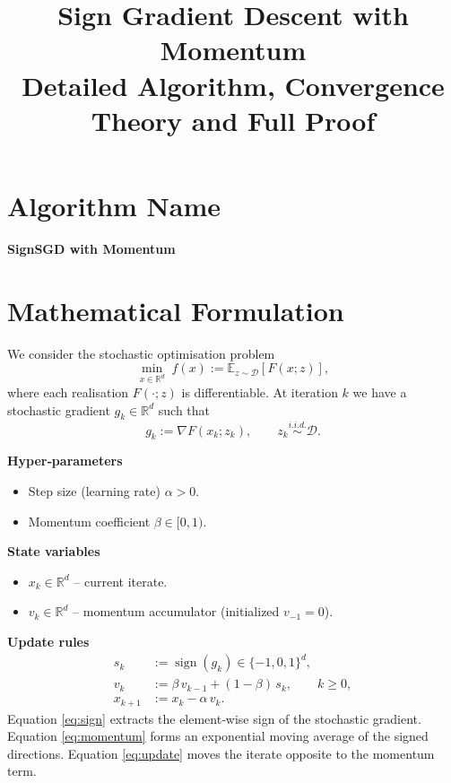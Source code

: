 \documentclass[11pt]{article}
\newcommand{\sign}{\operatorname{sign}}
\newcommand{\E}{\mathbb{E}}
\newcommand{\R}{\mathbb{R}}
\begin{document}
\title{Sign Gradient Descent with Momentum \\ Detailed Algorithm, Convergence Theory and Full Proof}
\author{}
\date{}
\maketitle

\tableofcontents
\newpage

\section*{Algorithm Name}
\begin{center}
\textbf{SignSGD with Momentum}
\end{center}
\section{Mathematical Formulation}
We consider the stochastic optimisation problem
\[
\min_{x\in\R^{d}} \; f(x):=\E_{z\sim\mathcal{D}}[F(x;z)],
\]
where each realisation $F(\cdot;z)$ is differentiable.  
At iteration $k$ we have a stochastic gradient $g_k\in\R^{d}$ such that 
\[
g_k:=\nabla F(x_k;z_k),\qquad z_k\stackrel{i.i.d.}{\sim}\mathcal{D}.
\]

\medskip
\noindent\textbf{Hyper‑parameters}
\begin{itemize}
    \item Step size (learning rate) $\alpha>0$.
    \item Momentum coefficient $\beta\in[0,1)$.
\end{itemize}

\medskip
\noindent\textbf{State variables}
\begin{itemize}
    \item $x_k\in\R^{d}$ – current iterate.
    \item $v_k\in\R^{d}$ – momentum accumulator (initialized $v_{-1}=0$).
\end{itemize}

\medskip
\noindent\textbf{Update rules}
\begin{align}
    s_k &:= \sign(g_k)\in\{-1,0,1\}^{d},\label{eq:sign}\\[4pt]
    v_k &:= \beta\, v_{k-1} + (1-\beta)\, s_k,\qquad  k\ge 0,\label{eq:momentum}\\[4pt]
    x_{k+1} &:= x_k - \alpha\, v_k.\label{eq:update}
\end{align}
Equation \eqref{eq:sign} extracts the element‑wise sign of the stochastic gradient.
Equation \eqref{eq:momentum} forms an exponential moving average of the signed directions.
Equation \eqref{eq:update} moves the iterate opposite to the momentum term.
\end{document}
